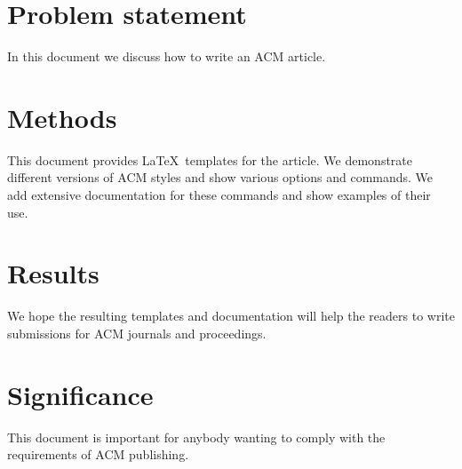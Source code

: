 \documentclass[acmcp]{acmart}
\begin{document}
\renewcommand{\shortauthors}{Trovato et al.}

\maketitle

\section{Problem statement}

In this document we discuss how to write an ACM article.

\section{Methods}

This document provides \LaTeX\ templates for the article. We
demonstrate different versions of ACM styles and show various options
and commands.  We add extensive documentation for these commands and
show examples of their use.

\section{Results}

We hope the resulting templates and documentation will help the
readers to write submissions for ACM journals and proceedings.

\section{Significance}

This document is important for anybody wanting to comply with the
requirements of ACM publishing.
\end{document}
